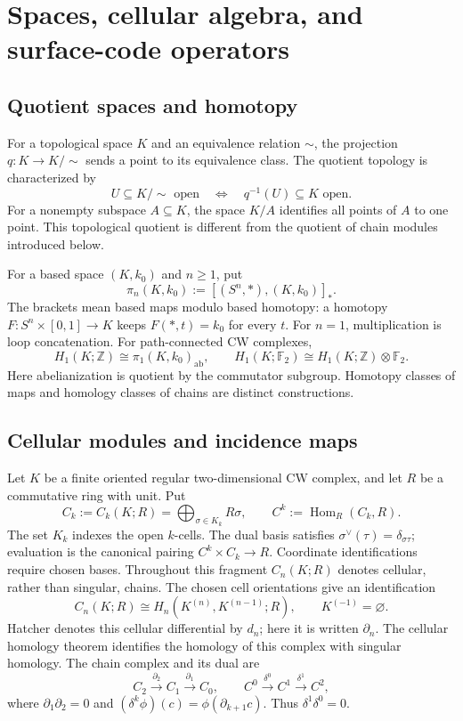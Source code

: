 
\section*{Spaces, cellular algebra, and surface-code operators}

\subsection*{Quotient spaces and homotopy}

For a topological space $K$ and an equivalence relation $\sim$, the
projection $q:K\to K/{\sim}$ sends a point to its equivalence class.
The quotient topology is characterized by
\[
 U\subseteq K/{\sim}\text{ open}
 \quad\Longleftrightarrow\quad q^{-1}(U)\subseteq K\text{ open}.
\]
For a nonempty subspace $A\subseteq K$, the space $K/A$ identifies all
points of $A$ to one point. This topological quotient is different from
the quotient of chain modules introduced below.

For a based space $(K,k_0)$ and $n\geq1$, put
\[
 \pi_n(K,k_0):=[(S^n,*),(K,k_0)]_*.
\]
The brackets mean based maps modulo based homotopy: a homotopy
$F:S^n\times[0,1]\to K$ keeps $F(*,t)=k_0$ for every $t$.
For $n=1$, multiplication is loop concatenation. For path-connected
CW complexes,
\[
 H_1(K;\mathbb Z)\cong\pi_1(K,k_0)_{\mathrm{ab}},
 \qquad
 H_1(K;\mathbb F_2)\cong H_1(K;\mathbb Z)\otimes\mathbb F_2.
\]
Here abelianization is quotient by the commutator subgroup. Homotopy
classes of maps and homology classes of chains are distinct constructions.

\subsection*{Cellular modules and incidence maps}

Let $K$ be a finite oriented regular two-dimensional CW complex,
and let $R$ be a commutative ring with unit. Put
\[
 C_k:=C_k(K;R)=\bigoplus_{\sigma\in K_k}R\sigma,
 \qquad C^k:=\operatorname{Hom}_R(C_k,R).
\]
The set $K_k$ indexes the open $k$-cells. The dual basis satisfies
$\sigma^\vee(\tau)=\delta_{\sigma\tau}$; evaluation is the canonical pairing
$C^k\times C_k\to R$. Coordinate identifications require chosen bases.
Throughout this fragment $C_n(K;R)$ denotes cellular, rather than
singular, chains. The chosen cell orientations give an identification
\[
 C_n(K;R)\cong H_n(K^{(n)},K^{(n-1)};R),
 \qquad K^{(-1)}=\varnothing.
\]
Hatcher denotes this cellular differential by $d_n$; here it is
written $\partial_n$. The cellular homology theorem identifies the
homology of this complex with singular homology.
The chain complex and its dual are
\[
 C_2\xrightarrow{\partial_2}C_1\xrightarrow{\partial_1}C_0,
 \qquad
 C^0\xrightarrow{\delta^0}C^1\xrightarrow{\delta^1}C^2,
\]
where $\partial_1\partial_2=0$ and
$(\delta^k\phi)(c)=\phi(\partial_{k+1}c)$.
Thus $\delta^1\delta^0=0$.

